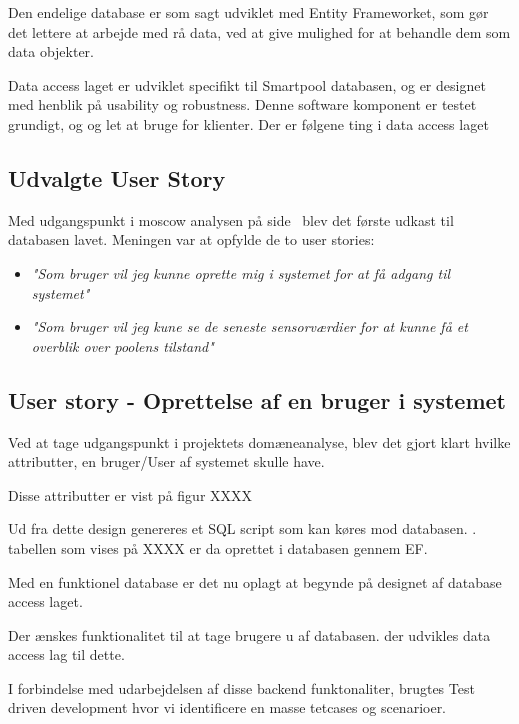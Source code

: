 Den endelige database er som sagt udviklet med Entity Frameworket, som gør det lettere at arbejde med rå data, ved at give mulighed for at behandle dem som data objekter.

Data access laget er udviklet specifikt til Smartpool databasen, og er designet med henblik på usability og robustness. Denne software komponent er testet grundigt, og og let at bruge for klienter.
Der er følgene ting i data access laget 
\subsection{Udvalgte User Story}

Med udgangspunkt i \gls{moscow} analysen på side~\pageref{sec:moscow} blev det første udkast til databasen lavet. Meningen var at opfylde de to user stories: 

\begin{itemize}
	\item \textit{"Som bruger vil jeg kunne oprette mig i systemet for at få adgang til systemet"}
	\item \textit{"Som bruger vil jeg kune se de seneste sensorværdier for at kunne få et overblik over poolens tilstand"}
\end{itemize}

\subsection{User story - Oprettelse af en bruger i systemet}

Ved at tage udgangspunkt i projektets domæneanalyse, blev det gjort klart hvilke attributter, en bruger/User af systemet skulle have.

Disse attributter er vist på figur XXXX


Ud fra dette design genereres et SQL script som kan køres mod databasen. . tabellen som vises på XXXX er da oprettet i databasen gennem EF.

Med en funktionel database er det nu oplagt at begynde på designet af database access laget.

Der ænskes funktionalitet til at tage brugere u af databasen. der udvikles data access lag til dette.

I forbindelse med udarbejdelsen af disse backend funktonaliter, brugtes Test driven development hvor vi identificere en masse tetcases og scenarioer.


